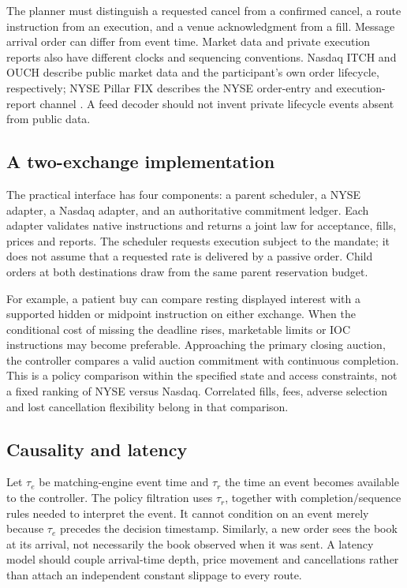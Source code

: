 \documentclass[11pt]{article}
\numberwithin{equation}{section}
\theoremstyle{definition}
\theoremstyle{remark}
\theoremstyle{definition}
\begin{document}
The planner must distinguish a requested cancel from a confirmed cancel,
a route instruction from an execution, and a venue acknowledgment from a
fill. Message arrival order can differ from event time. Market data and private
execution reports also have different clocks and sequencing conventions.
Nasdaq ITCH and OUCH describe public market data and the participant's own
order lifecycle, respectively; NYSE Pillar FIX describes the NYSE order-entry
and execution-report channel \citep{itch,ouch,nysefix}. A feed decoder should
not invent private lifecycle events absent from public data.

\subsection{A two-exchange implementation}

The practical interface has four components: a parent scheduler, a NYSE adapter,
a Nasdaq adapter, and an authoritative commitment ledger. Each adapter validates
native instructions and returns a joint law for acceptance, fills, prices and
reports. The scheduler requests execution subject to the mandate; it does not
assume that a requested rate is delivered by a passive order. Child orders at
both destinations draw from the same parent reservation budget.

For example, a patient buy can compare resting displayed interest with a
supported hidden or midpoint instruction on either exchange. When the
conditional cost of missing the deadline rises, marketable limits or IOC
instructions may become preferable. Approaching the primary closing auction,
the controller compares a valid auction commitment with continuous completion.
This is a policy comparison within the specified state and access constraints,
not a fixed ranking of NYSE versus Nasdaq. Correlated fills, fees, adverse
selection and lost cancellation flexibility belong in that comparison.

\subsection{Causality and latency}

Let $\tau_e$ be matching-engine event time and $\tau_r$ the time an event becomes
available to the controller. The policy filtration uses $\tau_r$, together
with completion/sequence rules needed to interpret the event. It cannot
condition on an event merely because $\tau_e$ precedes the decision timestamp.
Similarly, a new order sees the book at its arrival, not necessarily the book
observed when it was sent. A latency model should couple arrival-time depth,
price movement and cancellations rather than attach an independent constant
slippage to every route.
\end{document}
